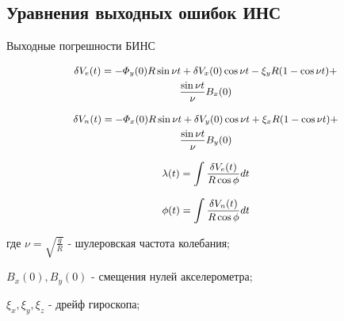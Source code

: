 \documentclass[aspectratio=43,display]{beamer}
\begin{document}
\subsection{Уравнения выходных ошибок ИНС}
\begin{frame}{Выходные погрешности БИНС}


\begin{equation}
	\label{eq:V_e}
	\small
	\begin{gathered}
		\delta V_e(t) = - \varPhi_y(0) R \sin \nu t + \delta V_x(0) \cos \nu t - \xi_y R (1 - \cos \nu t) + \\
		\frac{\sin \nu t}{ \nu } B_x(0)
	\end{gathered}
\end{equation}


\begin{equation}
	\label{eq:V_n}
	\small
	\begin{gathered}
		\delta V_n(t) = - \varPhi_x(0) R \sin \nu t + \delta V_y(0) \cos \nu t + \xi_x R (1 - \cos \nu t) + \\
		\frac{\sin \nu t}{ \nu } B_y(0)
	\end{gathered}
\end{equation}


\begin{equation}
	\label{eq:lambda}
	\small
	\begin{gathered}
		\lambda (t) = \int \frac{\delta V_e(t)}{R \cos \phi} dt
	\end{gathered}
\end{equation}

\begin{equation}
	\label{eq:phi}
	\small
	\begin{gathered}
		\phi (t) = \int \frac{\delta V_n(t)}{R \cos \phi} dt
	\end{gathered}
\end{equation}	

\vspace{0.15cm}
где { \small $ \nu = \sqrt{ \frac{g}{R} } $ } - шулеровская частота колебания;


{\small $ B_x(0), B_y(0) $} - смещения нулей акселерометра;


{\small $ \xi_x, \xi_y, \xi_z $} - дрейф гироскопа;
\end{frame}
\end{document}
